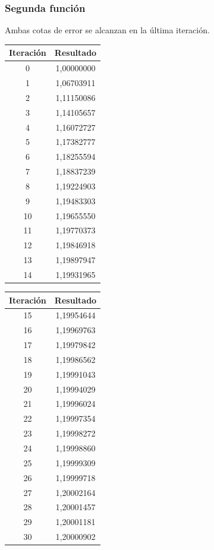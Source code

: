 \documentclass[titlepage,a4paper]{article}
\begin{document}
\subsubsection{Segunda función}\label{sec:NR2}
Ambas cotas de error se alcanzan en la última iteración.
\\
\begin{multicols}{2}
\begin{center}
    \begin{tabular}{| c | c |}
    \hline
     Iteración & Resultado \\ \hline
        0     & 1,00000000 \\
        1     & 1,06703911 \\
        2     & 1,11150086 \\
        3     & 1,14105657 \\
        4     & 1,16072727 \\
        5     & 1,17382777 \\
        6     & 1,18255594 \\
        7     & 1,18837239 \\
        8     & 1,19224903 \\
        9     & 1,19483303 \\
        10    & 1,19655550 \\
        11    & 1,19770373 \\
        12    & 1,19846918 \\
        13    & 1,19897947 \\
        14    & 1,19931965 \\
        
          \hline
    \end{tabular}
\end{center}
        
    \begin{center}
    \begin{tabular}{| c | c |}
    \hline    
     Iteración & Resultado \\ \hline
     15    & 1,19954644 \\
        16    & 1,19969763 \\
        17    & 1,19979842 \\
        18    & 1,19986562 \\
        19    & 1,19991043 \\
        20    & 1,19994029 \\
        21    & 1,19996024 \\
        22    & 1,19997354 \\
        23    & 1,19998272 \\
        24    & 1,19998860 \\
        25    & 1,19999309 \\
        26    & 1,19999718 \\
        27    & 1,20002164 \\
        28    & 1,20001457 \\
        29    & 1,20001181 \\
        30    & 1,20000902 \\
    \hline
    \end{tabular}
\end{center}
\end{multicols}
\end{document}
